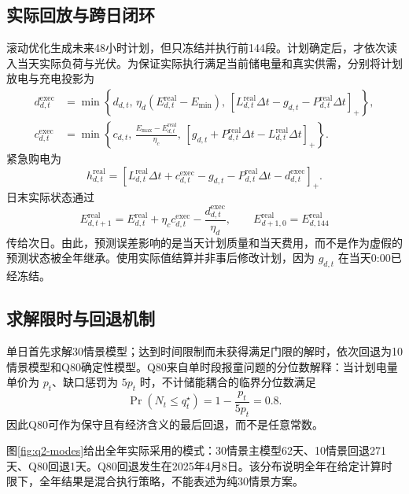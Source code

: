\documentclass[UTF8,12pt,a4paper]{ctexart}
\begin{document}
\subsection{实际回放与跨日闭环}

滚动优化生成未来48小时计划，但只冻结并执行前144段。计划确定后，才依次读入当天实际负荷与光伏。为保证实际执行满足当前储电量和真实供需，分别将计划放电与充电投影为
\begin{align}
d_{d,t}^{\mathrm{exec}}
&=\min\left\{d_{d,t},\,\eta_d(E_{d,t}^{\mathrm{real}}-E_{\min}),\,
[L_{d,t}^{\mathrm{real}}\Delta t-g_{d,t}-P_{d,t}^{\mathrm{real}}\Delta t]_+\right\},\\
c_{d,t}^{\mathrm{exec}}
&=\min\left\{c_{d,t},\,\frac{E_{\max}-E_{d,t}^{\mathrm{real}}}{\eta_c},\,
[g_{d,t}+P_{d,t}^{\mathrm{real}}\Delta t-L_{d,t}^{\mathrm{real}}\Delta t]_+\right\}.
\label{eq:q2-projection}
\end{align}
紧急购电为
\begin{equation}
h_{d,t}^{\mathrm{real}}=
\left[L_{d,t}^{\mathrm{real}}\Delta t+c_{d,t}^{\mathrm{exec}}
-g_{d,t}-P_{d,t}^{\mathrm{real}}\Delta t-d_{d,t}^{\mathrm{exec}}\right]_+.
\label{eq:q2-real-emergency}
\end{equation}
日末实际状态通过
\begin{equation}
E_{d,t+1}^{\mathrm{real}}=
E_{d,t}^{\mathrm{real}}+\eta_c c_{d,t}^{\mathrm{exec}}
-\frac{d_{d,t}^{\mathrm{exec}}}{\eta_d},
\qquad
E_{d+1,0}^{\mathrm{real}}=E_{d,144}^{\mathrm{real}}
\label{eq:q2-real-state}
\end{equation}
传给次日。由此，预测误差影响的是当天计划质量和当天费用，而不是作为虚假的预测状态被全年继承。使用实际值结算并非事后修改计划，因为 $g_{d,t}$ 在当天0:00已经冻结。

\subsection{求解限时与回退机制}

单日首先求解30情景模型；达到时间限制而未获得满足门限的解时，依次回退为10情景模型和Q80确定性模型。Q80来自单时段报童问题的分位数解释：当计划电量单价为 $p_t$、缺口惩罚为 $5p_t$ 时，不计储能耦合的临界分位数满足
\begin{equation}
\Pr(N_t\le q_t^\star)=1-\frac{p_t}{5p_t}=0.8.
\label{eq:q2-q80}
\end{equation}
因此Q80可作为保守且有经济含义的最后回退，而不是任意常数。

图\ref{fig:q2-modes}给出全年实际采用的模式：30情景主模型62天、10情景回退271天、Q80回退1天。Q80回退发生在2025年4月8日。该分布说明全年在给定计算时限下，全年结果是混合执行策略，不能表述为纯30情景方案。
\end{document}

